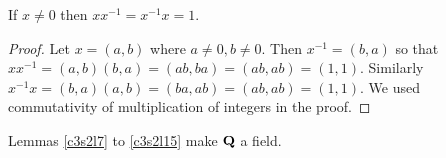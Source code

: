 \begin{lem}\label{c3s2l15}
If $x \ne 0$ then $xx^{-1} = x^{-1}x = 1$.
\end{lem}
\begin{proof}
Let $x = (a, b)$ where $a \ne 0, b \ne 0$. Then $x^{-1} = (b, a)$ so that
$xx^{-1} = (a, b)(b, a) = (ab, ba) = (ab, ab) = (1, 1)$. Similarly $x^{-1}x
= (b, a)(a, b) = (ba, ab) = (ab, ab) = (1, 1)$. We used commutativity of
multiplication of integers in the proof.
\end{proof}

Lemmas \ref{c3s2l7} to \ref{c3s2l15} make $\mathbf{Q}$ a field.

